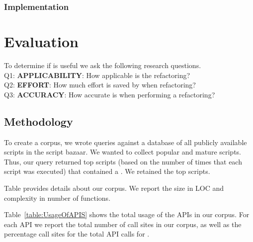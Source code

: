\documentclass[preprint]{sigplanconf}
\begin{document}
\subsubsection{Implementation}


\section{Evaluation}
\label{sec:evaluation}
To determine if \tool is useful we ask the following research questions.\\
Q1:  \textbf{APPLICABILITY}:  How applicable is the refactoring?\\
Q2:  \textbf{EFFORT}: How much effort is saved by \tool when refactoring?\\
Q3:  \textbf{ACCURACY}: How accurate is \tool when performing a refactoring?\\
 
\subsection{Methodology}

To create a corpus, we wrote queries against a database of all publicly available scripts in the \TD script bazaar. We wanted to collect popular and mature scripts. 
Thus, our query returned top scripts (based on the number of times that each script was executed) 
that contained a \NC{}. We retained the top \numScripts scripts.

Table provides details about our corpus.  We report the size in LOC and complexity in number of functions. 

Table~\ref{table:UsageOfAPIS} shows the total usage of the \NC APIs in our corpus.  For each API we report the total number of call sites in our corpus, as well as the percentage call sites for the total API calls for \NC.
\end{document}
